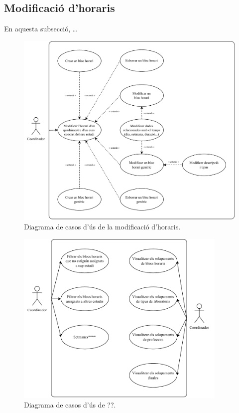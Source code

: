 \documentclass[a4paper,12pt]{ThesisStyle}
\begin{document}
\subsection{Modificació d'horaris}
\label{subsec:casos_us_d}

En aquesta subsecció, \dots

\begin{figure}[H]
  \centering
  \includegraphics[width=\textwidth]{assets/use_cases/horaris/modificar/modif.pdf}
  \caption{\label{img:casos_us_horaris_modif}Diagrama de casos d'ús de la modificació d'horaris.}
\end{figure}

\begin{figure}[H]
  \centering
  \includegraphics[width=0.9\textwidth]{assets/use_cases/horaris/modificar/opt.pdf}
  \caption{\label{img:casos_us_horaris_opt}Diagrama de casos d'ús de ??.}
\end{figure}
\end{document}
